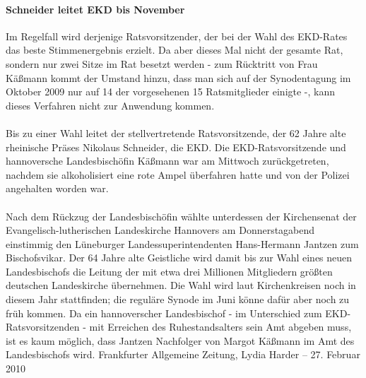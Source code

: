 \documentclass[a4paper,12pt,oneside]{scrbook}
\begin{document}
\paragraph{Schneider leitet EKD bis November}
Im Regelfall wird derjenige Ratsvorsitzender, der bei der Wahl des EKD-Rates das beste Stimmenergebnis erzielt. Da aber dieses Mal nicht der gesamte Rat, sondern nur zwei Sitze im Rat besetzt werden - zum Rücktritt von Frau Käßmann kommt der Umstand hinzu, dass man sich auf der Synodentagung im Oktober 2009 nur auf 14 der vorgesehenen 15 Ratsmitglieder einigte -, kann dieses Verfahren nicht zur Anwendung kommen.
\\\\
Bis zu einer Wahl leitet der stellvertretende Ratsvorsitzende, der 62 Jahre alte rheinische Präses Nikolaus Schneider, die EKD. Die EKD-Ratsvorsitzende und hannoversche Landesbischöfin Käßmann war am Mittwoch zurückgetreten, nachdem sie alkoholisiert eine rote Ampel überfahren hatte und von der Polizei angehalten worden war.
\\\\
Nach dem Rückzug der Landesbischöfin wählte unterdessen der Kirchensenat der Evangelisch-lutherischen Landeskirche Hannovers am Donnerstagabend einstimmig den Lüneburger Landessuperintendenten Hans-Hermann Jantzen zum Bischofsvikar. Der 64 Jahre alte Geistliche wird damit bis zur Wahl eines neuen Landesbischofs die Leitung der mit etwa drei Millionen Mitgliedern größten deutschen Landeskirche übernehmen. Die Wahl wird laut Kirchenkreisen noch in diesem Jahr stattfinden; die reguläre Synode im Juni könne dafür aber noch zu früh kommen. Da ein hannoverscher Landesbischof - im Unterschied zum EKD-Ratsvorsitzenden - mit Erreichen des Ruhestandsalters sein Amt abgeben muss, ist es kaum möglich, dass Jantzen Nachfolger von Margot Käßmann im Amt des Landesbischofs wird.
\newpage
Frankfurter Allgemeine Zeitung, Lydia Harder \hfill -- \hfill 27. Februar 2010
\end{document}

